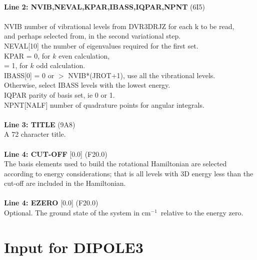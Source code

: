 \documentclass{elsart}
\def\cm{{cm$^{-1}$}}
\begin{document}
\begin{tabbing}
\\
{\bf Line 2: NVIB,NEVAL,KPAR,IBASS,IQPAR,NPNT} (6I5)\\
\\
NVIB \> number of vibrational levels from DVR3DRJZ for each k to be read,\\
\> and perhaps selected from, in the second variational step.\\
NEVAL[10] \> the number of eigenvalues required for the first set.\\
KPAR \> = 0, for $k$ even calculation,\\
        \> = 1, for $k$ odd calculation.\\
IBASS[0] \> = 0 or $>$ NVIB*(JROT+1), use all the vibrational levels.\\
        \> Otherwise, select IBASS levels with the lowest energy.\\
IQPAR \> parity of basis set, ie 0 or 1.\\
NPNT[NALF] number of quadrature points for angular integrals.\\
\\
{\bf Line 3: TITLE} (9A8)\\
A 72 character title.\\
\\
{\bf Line 4: CUT-OFF} [0.0] (F20.0)\\
The basis elements used to build the rotational Hamiltonian are selected according to energy considerations; that is all levels with 3D energy less than the cut-off are included in the Hamiltonian.\\
\\
{\bf Line 4: EZERO} [0.0] (F20.0)\\
Optional. The ground state of the system in \cm\ relative to the energy zero.\\
\end{tabbing}

\section{Input for DIPOLE3}
\end{document}
